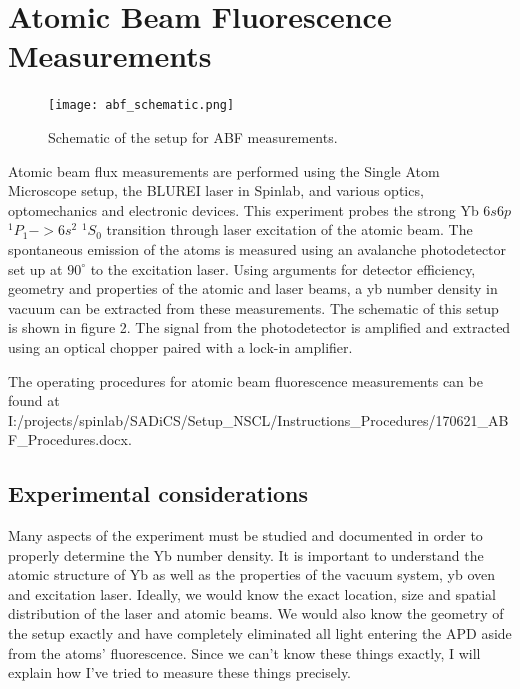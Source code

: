 \documentclass[12pt, a4paper]{article}
\begin{document}
\section{Atomic Beam Fluorescence Measurements}
\begin{figure}
  \texttt{[image: abf\_schematic.png]}
  \vspace*{-3mm}
  \caption{Schematic of the setup for ABF measurements.}
\end{figure}
Atomic beam flux measurements are performed using the Single Atom Microscope setup, the BLUREI laser in Spinlab, and various optics, optomechanics and electronic devices. This experiment probes the strong Yb $6s6p$ $ ^{1}P_{1} -> 6s^2 $ $^{1}S_{0}$ transition through laser excitation of the atomic beam. The spontaneous emission of the atoms is measured using an avalanche photodetector set up at $90^{\circ}$ to the excitation laser. Using arguments for detector efficiency, geometry and properties of the atomic and laser beams, a yb number density in vacuum can be extracted from these measurements. The schematic of this setup is shown in figure 2. The signal from the photodetector is amplified and extracted using an optical chopper paired with a lock-in amplifier.

The operating procedures for atomic beam fluorescence measurements can be found at I:/projects/spinlab/SADiCS/Setup\_NSCL/Instructions\_Procedures/170621\_ABF\_Procedures.docx.
 
\subsection{Experimental considerations}
Many aspects of the experiment must be studied and documented in order to properly determine the Yb number density. It is important to understand the atomic structure of Yb as well as the properties of the vacuum system, yb oven and excitation laser. Ideally, we would know the exact location, size and spatial distribution of the laser and atomic beams. We would also know the geometry of the setup exactly and have completely eliminated all light entering the APD aside from the atoms' fluorescence. Since we can't know these things exactly, I will explain how I've tried to measure these things precisely. 
\end{document}
